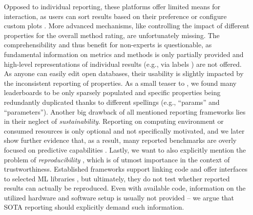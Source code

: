 \documentclass[sn-mathphys,Numbered]{sn-jnl}%
\theoremstyle{thmstylethree}%
\begin{document}
Opposed to individual reporting, these platforms offer limited means for interaction, as users can sort results based on their preference \cite{croce2020robustbench,vanschoren2014openml} or configure custom plots \cite{vanschoren2014openml,paperswithcode}.
More advanced mechanisms, like controlling the impact of different properties for the overall method rating, are unfortunately missing.
The comprehensibility and thus benefit for non-experts is questionable, as fundamental information on metrics and methods is only partially provided and high-level representations of individual results (e.g., via labels \cite{yeswecare}) are not offered.
As anyone can easily edit open databases, their usability is slightly impacted by the inconsistent reporting of properties.
As a small teaser to , we found many leaderboards to be only sparsely populated and specific properties being redundantly duplicated thanks to different spellings (e.g., ``params'' and ``parameters'').
Another big drawback of all mentioned reporting frameworks lies in their neglect of \emph{sustainability}.
Reporting on computing environment or consumed resources is only optional and not specifically motivated, and we later show further evidence that, as a result, many reported benchmarks are overly focused on predictive capabilities \cite{Schwartz/etal/2020b}.
Lastly, we want to also explicitly mention the problem of \emph{reproducibility} \cite{hutson_artificial_2018,pineau_improving_2021}, which is of utmost importance in the context of trustworthiness.
Established frameworks support linking code \cite{paperswithcode} and offer interfaces to selected ML libraries \cite{vanschoren2014openml}, but ultimately, they do not test whether reported results can actually be reproduced.
Even with available code, information on the utilized hardware and software setup is usually not provided -- we argue that SOTA reporting should explicitly demand such information.
\end{document}
